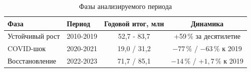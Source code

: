 \begin{table}[h!]
\centering
\caption{Фазы анализируемого периода}
\label{tab:phases}
\begin{tabular}{llcc}
\toprule
Фаза & Период & Годовой итог, млн & Динамика \\
\midrule
Устойчивый рост & 2010-2019 & 52,7 - 83,7 & +59\,\% за десятилетие \\
COVID-шок & 2020-2021 & 19,0 / 31,2 & $-77\,\%$ / $-63\,\%$ к 2019 \\
Восстановление & 2022-2023 & 71,7 / 85,1 & $-14\,\%$ / $+1{,}7\,\%$ к 2019 \\
\bottomrule
\end{tabular}
\end{table}

